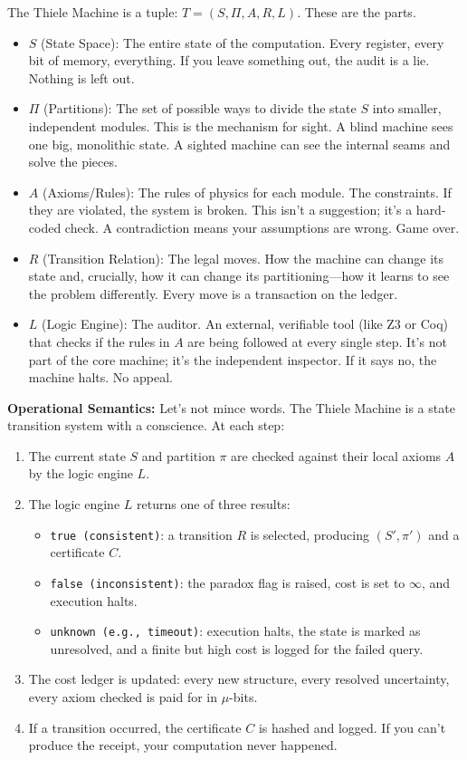 \documentclass[11pt]{article}
\begin{document}
The Thiele Machine is a tuple: $T = (S, \Pi, A, R, L)$. These are the parts.

\begin{itemize}
  \item $S$ (State Space): The entire state of the computation. Every register, every bit of memory, everything. If you leave something out, the audit is a lie. Nothing is left out.
  \item $\Pi$ (Partitions): The set of possible ways to divide the state $S$ into smaller, independent modules. This is the mechanism for sight. A blind machine sees one big, monolithic state. A sighted machine can see the internal seams and solve the pieces.
  \item $A$ (Axioms/Rules): The rules of physics for each module. The constraints. If they are violated, the system is broken. This isn't a suggestion; it's a hard-coded check. A contradiction means your assumptions are wrong. Game over.
  \item $R$ (Transition Relation): The legal moves. How the machine can change its state and, crucially, how it can change its partitioning—how it learns to see the problem differently. Every move is a transaction on the ledger.
  \item $L$ (Logic Engine): The auditor. An external, verifiable tool (like Z3 or Coq) that checks if the rules in $A$ are being followed at every single step. It's not part of the core machine; it's the independent inspector. If it says no, the machine halts. No appeal.
\end{itemize}

\textbf{Operational Semantics:}
Let’s not mince words. The Thiele Machine is a state transition system with a conscience. At each step:
\begin{enumerate}
  \item The current state $S$ and partition $\pi$ are checked against their local axioms $A$ by the logic engine $L$.
  \item The logic engine $L$ returns one of three results:
    \begin{itemize}
      \item \texttt{true (consistent)}: a transition $R$ is selected, producing $(S', \pi')$ and a certificate $C$.
      \item \texttt{false (inconsistent)}: the paradox flag is raised, cost is set to $\infty$, and execution halts.
      \item \texttt{unknown (e.g., timeout)}: execution halts, the state is marked as unresolved, and a finite but high cost is logged for the failed query.
    \end{itemize}
  \item The cost ledger is updated: every new structure, every resolved uncertainty, every axiom checked is paid for in $\mu$-bits.
  \item If a transition occurred, the certificate $C$ is hashed and logged. If you can’t produce the receipt, your computation never happened.
\end{enumerate}
\end{document}
